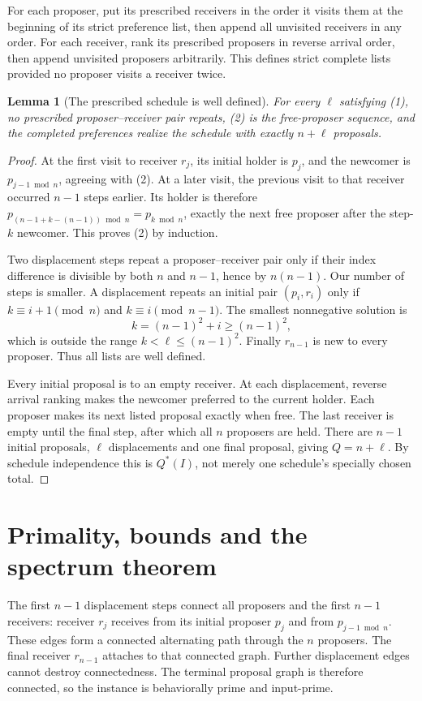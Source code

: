 \documentclass[11pt,a4paper]{article}
\newtheorem{lemma}[theorem]{Lemma}
\begin{document}
For each proposer, put its prescribed receivers in the order it visits them at the beginning of its strict preference list, then append all unvisited receivers in any order. For each receiver, rank its prescribed proposers in reverse arrival order, then append unvisited proposers arbitrarily. This defines strict complete lists provided no proposer visits a receiver twice.

\begin{lemma}[The prescribed schedule is well defined]
For every $\ell$ satisfying (1), no prescribed proposer--receiver pair repeats, (2) is the free-proposer sequence, and the completed preferences realize the schedule with exactly $n+\ell$ proposals.
\end{lemma}
\begin{proof}
At the first visit to receiver $r_j$, its initial holder is $p_j$, and the newcomer is $p_{j-1\bmod n}$, agreeing with (2). At a later visit, the previous visit to that receiver occurred $n-1$ steps earlier. Its holder is therefore
$p_{(n-1+k-(n-1))\bmod n}=p_{k\bmod n}$, exactly the next free proposer after the step-$k$ newcomer. This proves (2) by induction.

Two displacement steps repeat a proposer--receiver pair only if their index difference is divisible by both $n$ and $n-1$, hence by $n(n-1)$. Our number of steps is smaller. A displacement repeats an initial pair $(p_i,r_i)$ only if
$k\equiv i+1\pmod n$ and $k\equiv i\pmod{n-1}$.
The smallest nonnegative solution is
\[
 k=(n-1)^2+i\ge(n-1)^2,
\]
which is outside the range $k<\ell\le(n-1)^2$. Finally $r_{n-1}$ is new to every proposer. Thus all lists are well defined.

Every initial proposal is to an empty receiver. At each displacement, reverse arrival ranking makes the newcomer preferred to the current holder. Each proposer makes its next listed proposal exactly when free. The last receiver is empty until the final step, after which all $n$ proposers are held. There are $n-1$ initial proposals, $\ell$ displacements and one final proposal, giving $Q=n+\ell$. By schedule independence this is $Q^*(I)$, not merely one schedule's specially chosen total.
\end{proof}

\section{Primality, bounds and the spectrum theorem}
The first $n-1$ displacement steps connect all proposers and the first $n-1$ receivers: receiver $r_j$ receives from its initial proposer $p_j$ and from $p_{j-1\bmod n}$. These edges form a connected alternating path through the $n$ proposers. The final receiver $r_{n-1}$ attaches to that connected graph. Further displacement edges cannot destroy connectedness. The terminal proposal graph is therefore connected, so the instance is behaviorally prime and input-prime.
\end{document}
